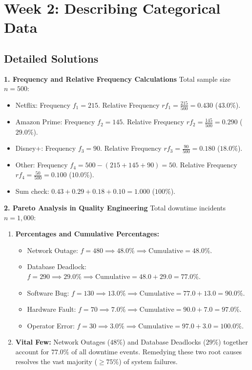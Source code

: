 \section*{Week 2: Describing Categorical Data}

\subsection*{Detailed Solutions}

\textbf{1. Frequency and Relative Frequency Calculations}
Total sample size $n = 500$:
\begin{itemize}
    \item Netflix: Frequency $f_1 = 215$. Relative Frequency $rf_1 = \frac{215}{500} = \mathbf{0.430}$ ($43.0\%$).
    \item Amazon Prime: Frequency $f_2 = 145$. Relative Frequency $rf_2 = \frac{145}{500} = \mathbf{0.290}$ ($29.0\%$).
    \item Disney+: Frequency $f_3 = 90$. Relative Frequency $rf_3 = \frac{90}{500} = \mathbf{0.180}$ ($18.0\%$).
    \item Other: Frequency $f_4 = 500 - (215 + 145 + 90) = 50$. Relative Frequency $rf_4 = \frac{50}{500} = \mathbf{0.100}$ ($10.0\%$).
    \item Sum check: $0.43 + 0.29 + 0.18 + 0.10 = 1.000$ ($100\%$).
\end{itemize}

\textbf{2. Pareto Analysis in Quality Engineering}
Total downtime incidents $n = 1{,}000$:
\begin{enumerate}
    \item \textbf{Percentages and Cumulative Percentages:}
    \begin{itemize}
        \item Network Outage: $f = 480 \implies 48.0\% \implies \text{Cumulative} = \mathbf{48.0\%}$.
        \item Database Deadlock: $f = 290 \implies 29.0\% \implies \text{Cumulative} = 48.0 + 29.0 = \mathbf{77.0\%}$.
        \item Software Bug: $f = 130 \implies 13.0\% \implies \text{Cumulative} = 77.0 + 13.0 = \mathbf{90.0\%}$.
        \item Hardware Fault: $f = 70 \implies 7.0\% \implies \text{Cumulative} = 90.0 + 7.0 = \mathbf{97.0\%}$.
        \item Operator Error: $f = 30 \implies 3.0\% \implies \text{Cumulative} = 97.0 + 3.0 = \mathbf{100.0\%}$.
    \end{itemize}
    \item \textbf{Vital Few:} Network Outages ($48\%$) and Database Deadlocks ($29\%$) together account for $77.0\%$ of all downtime events. Remedying these two root causes resolves the vast majority ($\ge 75\%$) of system failures.
\end{enumerate}

